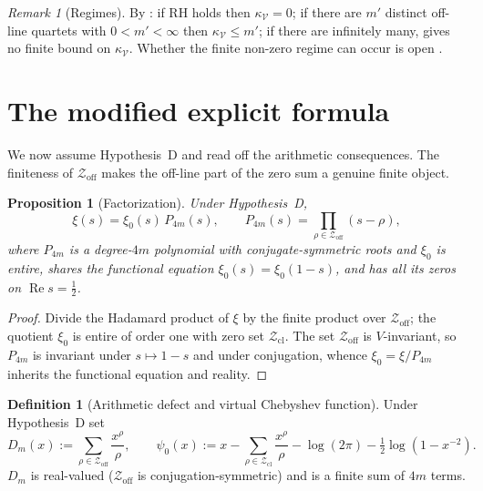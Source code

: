 \documentclass[11pt]{amsart}
\newtheorem{proposition}[theorem]{Proposition}
\theoremstyle{definition}
\newtheorem{definition}[theorem]{Definition}
\theoremstyle{remark}
\newtheorem{remark}[theorem]{Remark}
\newcommand{\RH}{\mathrm{RH}}
\renewcommand{\Re}{\operatorname{Re}}
\newcommand{\half}{\tfrac12}
\newcommand{\Zoff}{\mathcal Z_{\mathrm{off}}}
\newcommand{\Zcl}{\mathcal Z_{\mathrm{cl}}}
\begin{document}
\begin{remark}[Regimes]\label{cor:trichotomy}
By \cite[Prop.~7.2]{Index}: if $\RH$ holds then $\kappa_{\mathcal V}=0$; if there are $m'$
distinct off-line quartets with $0<m'<\infty$ then $\kappa_{\mathcal V}\le m'$; if there are
infinitely many, \cite{Index} gives no finite bound on $\kappa_{\mathcal V}$. Whether the finite non-zero regime
can occur is open \cite[Prop.~7.3]{Index}.
\end{remark}

\section{The modified explicit formula}\label{sec:mef}

We now assume Hypothesis~D and read off the arithmetic consequences. The finiteness of $\Zoff$
makes the off-line part of the zero sum a genuine finite object.

\begin{proposition}[Factorization]\label{prop:factor}
Under Hypothesis~D,
\[
\xi(s)=\xi_0(s)\,P_{4m}(s),\qquad P_{4m}(s)=\prod_{\rho\in\Zoff}(s-\rho),
\]
where $P_{4m}$ is a degree-$4m$ polynomial with conjugate-symmetric roots and $\xi_0$ is
entire, shares the functional equation $\xi_0(s)=\xi_0(1-s)$, and has all its zeros on
$\Re s=\half$.
\end{proposition}
\begin{proof}
Divide the Hadamard product of $\xi$ by the finite product over $\Zoff$; the quotient $\xi_0$
is entire of order one with zero set $\Zcl$. The set $\Zoff$ is $V$-invariant, so $P_{4m}$ is
invariant under $s\mapsto1-s$ and under conjugation, whence $\xi_0=\xi/P_{4m}$ inherits the
functional equation and reality.
\end{proof}

\begin{definition}[Arithmetic defect and virtual Chebyshev function]\label{def:defect}
Under Hypothesis~D set
\[
D_m(x):=\sum_{\rho\in\Zoff}\frac{x^\rho}{\rho},\qquad
\psi_0(x):=x-\sum_{\rho\in\Zcl}\frac{x^\rho}{\rho}-\log(2\pi)-\half\log(1-x^{-2}).
\]
$D_m$ is real-valued ($\Zoff$ is conjugation-symmetric) and is a finite sum of $4m$ terms.
\end{definition}
\end{document}
